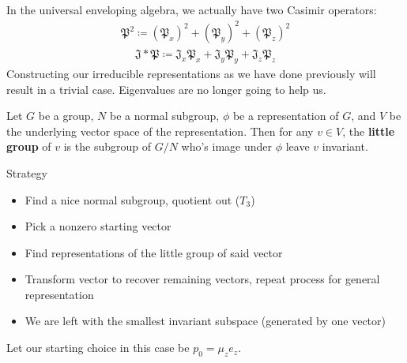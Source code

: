 \documentclass[compress,aspectratio=169,10pt,usenames,dvipsnames]{beamer}
\begin{document}
\begin{frame}
\vfill
In the universal enveloping algebra, we actually have two Casimir operators:
\begin{equation}\begin{aligned}\mathfrak{P^2}\coloneq (\mathfrak{P}_x)^2 + (\mathfrak{P}_y)^2 + (\mathfrak{P}_z)^2\end{aligned}\end{equation} \begin{equation}\begin{aligned}\mathfrak{J}* \mathfrak{P} \coloneq \mathfrak{J}_x\mathfrak{P}_x +\mathfrak{J}_y\mathfrak{P}_y + \mathfrak{J}_z\mathfrak{P}_z\end{aligned}\end{equation}
\vfill
Constructing our irreducible representations as we have done previously will result in a trivial case. Eigenvalues are no longer going to help us.
\vfill
\begin{definition}
	Let $G$ be a group, $N$ be a normal subgroup, $\phi$ be a representation of $G$, and $V$ be the underlying vector space of the representation. Then for any $v\in V$, the \textbf{little group} of $v$ is the subgroup of $G/N$ who's image under $\phi$ leave $v$ invariant.
\end{definition}
\vfill
\end{frame}
%
%
\begin{frame}
\vfill
\begin{block}{Strategy}
\begin{itemize}
	\item Find a nice normal subgroup, quotient out ($T_3$)
	\item Pick a nonzero starting vector
	\item Find representations of the little group of said vector
	\item Transform vector to recover remaining vectors, repeat process for general representation
	\item We are left with the smallest invariant subspace (generated by one vector)
\end{itemize}
\end{block}
\vfill
Let our starting choice in this case be $p_0 = \mu_ze_z$.
\end{frame}
\end{document}
